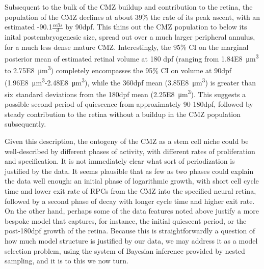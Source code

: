 Subsequent to the bulk of the CMZ buildup and contribution to the retina, the population of the CMZ declines at about 39\% the rate of its peak ascent, with an estimated -90.1$\frac{cells}{d}$ by 90dpf. This thins out the CMZ population to below its inital postembryogenesic size, spread out over a much larger peripheral annulus, for a much less dense mature CMZ. Interestingly, the 95\% CI on the marginal posterior mean of estimated retinal volume at 180 dpf (ranging from \SI{1.84E8}{\cubic\micro\metre} to \SI{2.75E8}{\cubic\micro\metre}) completely encompasses the 95\% CI on volume at 90dpf (\SI{1.96E8}{\cubic\micro\metre}-\SI{2.48E8}{\cubic\micro\metre}), while the 360dpf mean (\SI{3.85E8}{\cubic\micro\metre}) is greater than six standard deviations from the 180dpf mean (\SI{2.25E8}{\cubic\micro\metre}). This suggests a possible second period of quiescence from approximately 90-180dpf, followed by steady contribution to the retina without a buildup in the CMZ population subsequently.

Given this description, the ontogeny of the CMZ as a stem cell niche could be well-described by different phases of activity, with different rates of proliferation and specification. It is not immediately clear what sort of periodization is justified by the data. It seems plausible that as few as two phases could explain the data well enough: an initial phase of logarithmic growth, with short cell cycle time and lower exit rate of RPCs from the CMZ into the specified neural retina, followed by a second phase of decay with longer cycle time and higher exit rate. On the other hand, perhaps some of the data features noted above justify a more bespoke model that captures, for instance, the initial quiescent period, or the post-180dpf growth of the retina. Because this is straightforwardly a question of how much model structure is justified by our data, we may address it as a model selection problem, using the system of Bayesian inference provided by nested sampling, and it is to this we now turn.

